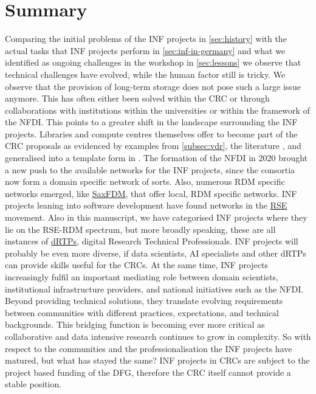 \documentclass{eceasst}
\begin{document}
\section{Summary}
Comparing the initial problems of the INF projects in \autoref{sec:history}
with the actual tasks that INF projects perform in \autoref{sec:inf-in-germany}
and what we identified as ongoing challenges in the workshop in \autoref{sec:lessons}
we observe that technical challenges have evolved, while the human factor still is tricky.
We observe that the provision of long-term storage does not pose such a large issue anymore. This has often either been solved within the CRC or through
collaborations with institutions within the universities or within the framework of the NFDI.
This points to a greater shift in the landscape surrounding the INF projects.
Libraries and compute centres themselves offer to become part of the CRC proposals as evidenced by examples from \autoref{subsec:vdr}, the literature \cite{Hausen_Rosenberg_Trautwein-Bruns_Schwarz_2020},
and generalised into a template form in \cite{Kempf2026}.
The formation of the NFDI in 2020 brought a new push to the available networks for the INF projects, since
the consortia now form a domain specific network of sorts.
Also, numerous RDM specific networks emerged, like \href{https://saxfdm.de/}{SaxFDM}, that offer local, RDM specific networks.
INF projects leaning into software development have found networks in the \href{https://de-rse.org/}{RSE} movement.
Also in this manuscript, we have categorised INF projects where they lie on the RSE-RDM spectrum, but more broadly speaking,
these are all instances of \href{https://drtp-skills.ac.uk/}{dRTPs}, digital Research Technical Professionals.
INF projects will probably be even more diverse, if data scientists, AI specialists and other dRTPs can provide skills useful for the CRCs.
At the same time, INF projects increasingly fulfil an important mediating role between domain scientists, 
institutional infrastructure providers, and national initiatives such as the NFDI. Beyond providing technical solutions, 
they translate evolving requirements between communities with different practices, expectations, and technical backgrounds. 
This bridging function is becoming ever more critical as collaborative and data intensive research continues to grow in complexity.
So with respect to the communities and the professionalisation the INF projects have matured, but what has stayed the same?
INF projects in CRCs are subject to the project based funding of the DFG, therefore the CRC itself cannot provide a stable position.
\end{document}
